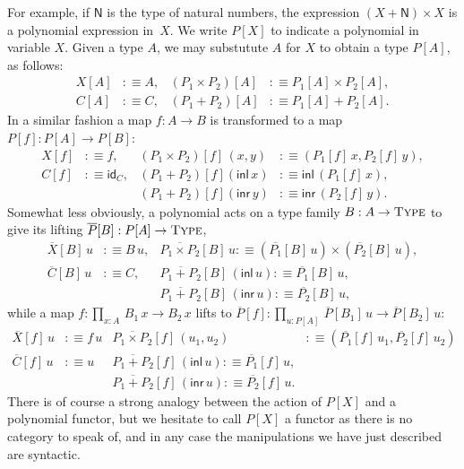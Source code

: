 \documentclass[a4paper,UKenglish]{lipics-v2016}
\newcommand{\tyFont}[1]{\textsf{#1}} %
\newcommand{\termFont}[1]{\textsf{#1}} %
\newcommand{\nat}{\tyFont{N}} %
\newcommand{\lift}[1]{\overline{#1}} %
\newcommand{\defeq}{\mathrel{{:}{\equiv}}} %
\newcommand{\idmap}[1]{\termFont{id}_{#1}} %
\newcommand{\inl}[1]{\termFont{inl}\,#1} %
\newcommand{\inr}[1]{\termFont{inr}\,#1} %
\newcommand{\dprod}[1]{{\textstyle\prod_{#1}}\,} %
\newcommand{\Type}[0]{\operatorname{\textsc{Type}}}
\begin{document}
For example, if $\nat$ is the type of natural numbers, the expression
$(X + \nat) \times X$ is a polynomial expression in~$X$. We write $P[X]$ to indicate a
polynomial in variable $X$. Given a type $A$, we may substutute $A$ for $X$ to obtain a
type $P[A]$, as follows:
%
\begin{align*}
  X[A] &\defeq A, &
  (P_1 \times P_2)[A] &\defeq P_1[A] \times P_2[A], \\
  C[A] &\defeq C, &
  (P_1 + P_2)[A] &\defeq P_1[A] + P_2[A].
\end{align*}
%
In a similar fashion a map $f : A \to B$ is transformed to a map $P[f] : P[A] \to P[B]$:
%
\begin{align*}
  X[f] &\defeq f, &
  (P_1 \times P_2)[f] \, (x,y) &\defeq (P_1[f]\, x, P_2[f] \, y), \\
  C[f] &\defeq \idmap{C}, &
  (P_1 + P_2)[f](\inl{x}) &\defeq \inl{(P_1[f]\,x)}, \\
  & &
  (P_1 + P_2)[f](\inr{y}) &\defeq \inr{(P_2[f]\,y)}.
\end{align*}
%
Somewhat less obviously, a polynomial acts on a type family $B : A \to \Type$ to
give its lifting $\lift{P}[B] : P[A] \to \Type$,
%
\begin{align*}
  \lift{X}[B] \, u &\defeq B\,u, &
  \lift{P_1 \times P_2}[B] \, u \defeq (\lift{P_1}[B]\,u) \times (\lift{P_2}[B]\,u), \\
  \lift{C}[B] \, u &\defeq C, &
  \lift{P_1 + P_2}[B] \, (\inl{u})\defeq \lift{P_1}[B]\,u, \\
  & &
  \lift{P_1 + P_2}[B] \, (\inr{u})\defeq \lift{P_2}[B]\,u,
\end{align*}
%
while a map $f : \dprod{x : A} B_1\,x \to B_2\,x$ lifts to
$\lift{P}[f] : \dprod{u : P[A]} \lift{P}[B_1]\,u \to \lift{P}[B_2]\,u$:
%
\begin{align*}
  \lift{X}[f] \, u &\defeq f \, u &
  \lift{P_1 \times P_2}[f] \, (u_1, u_2) &\defeq (\lift{P_1}[f]\,u_1, \lift{P_2}[f]\,u_2) \\
  \lift{C}[f] \, u &\defeq u &
  \lift{P_1 + P_2}[f] \, (\inl{u})\defeq \lift{P_1}[f]\,u, \\
  & &
  \lift{P_1 + P_2}[f] \, (\inr{u})\defeq \lift{P_2}[f]\,u.
\end{align*}
%
There is of course a strong analogy between the action of $P[X]$ and a polynomial functor,
but we hesitate to call $P[X]$ a functor as there is no category to speak of, and in any
case the manipulations we have just described are syntactic.
\end{document}
